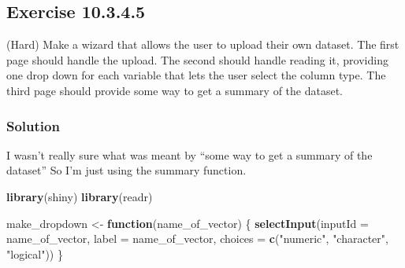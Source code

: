 \documentclass[]{book}
\newenvironment{Shaded}{\begin{snugshade}}{\end{snugshade}}
\newcommand{\ControlFlowTok}[1]{\textcolor[rgb]{0.13,0.29,0.53}{\textbf{#1}}}
\newcommand{\DataTypeTok}[1]{\textcolor[rgb]{0.13,0.29,0.53}{#1}}
\newcommand{\KeywordTok}[1]{\textcolor[rgb]{0.13,0.29,0.53}{\textbf{#1}}}
\newcommand{\NormalTok}[1]{#1}
\newcommand{\StringTok}[1]{\textcolor[rgb]{0.31,0.60,0.02}{#1}}
\begin{document}
\hypertarget{exercise-10.3.4.5}{%
\subsection*{Exercise 10.3.4.5}\label{exercise-10.3.4.5}}

(Hard) Make a wizard that allows the user to upload their own dataset. The first page should handle the upload. The second should handle reading it, providing one drop down for each variable that lets the user select the column type. The third page should provide some way to get a summary of the dataset.

\begin{solution}

\hypertarget{solution-8}{%
\subsubsection*{Solution}\label{solution-8}}

\begin{note}

I wasn't really sure what was meant by ``some way to get a summary of the dataset'' So I'm just using the summary function.

\end{note}

\begin{Shaded}
\begin{Highlighting}[]
\KeywordTok{library}\NormalTok{(shiny)}
\KeywordTok{library}\NormalTok{(readr)}

\NormalTok{make_dropdown <-}\StringTok{ }\ControlFlowTok{function}\NormalTok{(name_of_vector) \{}
  \KeywordTok{selectInput}\NormalTok{(}\DataTypeTok{inputId =}\NormalTok{ name_of_vector, }\DataTypeTok{label =}\NormalTok{  name_of_vector, }\DataTypeTok{choices =} 
                \KeywordTok{c}\NormalTok{(}\StringTok{"numeric"}\NormalTok{, }\StringTok{"character"}\NormalTok{, }\StringTok{"logical"}\NormalTok{))}
\NormalTok{\}  }


\end{Highlighting}
\end{Shaded}
\end{solution}
\end{document}
